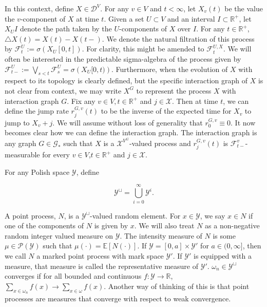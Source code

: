 \documentclass[12pt]{article}
\newcommand{\mb}{\mathbb}
\newcommand{\mc}{\mathcal}
\newcommand{\ra}{\rightarrow}
\newcommand{\ind}{\hspace{24pt}}
\newcommand{\ex}[1]{\mb{E}\left[#1\right]}			%
\newcommand{\defeq}{:=}								%
\newcommand{\pmsr}{\mc{P}}							%
\newcommand{\cad}{\mc{D}}							%
\newcommand{\sta}{\mc{X}}							%
\newcommand{\Xf}{X}									%
\newcommand{\poiss}{N}								%
\newcommand{\rate}{r}								%
\newcommand{\F}{\mc{F}}								%
\newcommand{\delt}{\triangle}						%
\newcommand{\vind}[1]{_{#1}}						%
\newcommand{\tme}[1]{(#1)}							%
\newcommand{\tmi}[1]{#1}							%
\newcommand{\gind}[1]{^{#1}}						%
\newcommand{\vpara}[1]{^{#1}}						%
\newcommand{\stpara}[1]{_{#1}}						%
\newcommand{\tpara}[1]{_{#1}}						%
\newcommand{\gvpara}[2]{^{#1,#2}}					%
\newcommand{\vpropara}[2]{^{#1,#2}}					%
\newcommand{\Gs}{\mc{G}_\ast}						%
\newcommand{\spce}{\mc{Y}}							%
\renewcommand{\it}[1]{_{#1}}						%
\begin{document}
\ind In this context, define \(\Xf \in \cad\vpara{V}\). For any \(v \in V\) and \(t < \infty\), let \(\Xf\vind{v}\tme{t}\) be the value the \(v\)-component of \(\Xf\) at time \(t\). Given a set \(U\subset V\) and an interval \(I \subset \mb{R}^+\), let \(\Xf\vind{U}\tmi{I}\) denote the path taken by the \(U\)-components of \(\Xf\) over \(\tmi{I}\). For any \(t\in\mb{R}^+\), \(\delt \Xf\tme{t} = \Xf\tme{t} - \Xf\tme{t-}\). We denote the natural filtration of this process by \(\F\vpara{U}\tpara{t} \defeq \sigma \left(\Xf\vind{U}\tmi{[0,t]}\right)\). For clarity, this might be amended to \(\F\vpropara{U}{\Xf}\tpara{t}\). We will often be interested in the predictable sigma-algebra of the process given by \(\F\vpara{U}\tpara{t-} \defeq \bigvee_{s < t} \F\vpara{U}\tpara{s} = \sigma\left(\Xf\vind{U}\tmi{[0,t)}\right)\). Furthermore, when the evolution of \(\Xf\) with respect to its topology is clearly defined, but the specific interaction graph of \(\Xf\) is not clear from context, we may write \(\Xf\gind{G}\) to represent the process \(\Xf\) with interaction graph \(G\). Fix any \(v \in V,t \in \mb{R}^+\) and \(j \in \sta\). Then at time \(t\), we can define the jump rate \(\rate\gvpara{G}{v}\stpara{j}(t)\) to be the inverse of the expected time for \(\Xf\vind{v}\) to jump to \(\Xf\vind{v} + j\). We will assume without loss of generality that \(\rate\gvpara{G}{v}\stpara{0}\equiv 0\). It now becomes clear how we can define the interaction graph. The interaction graph is any graph \(G\in \Gs\) such that \(\Xf\) is a \(\sta^{V\gind{G}}\)-valued process and \(\rate\gvpara{G}{v}\stpara{j}(t)\) is \(\F\vpara{v}\tpara{t-}\)-measurable for every \(v \in V\),\(t\in \mb{R}^+\) and \(j \in \sta\). 

\ind For any Polish space \(\spce\), define

\[\spce^\sqcup = \bigcup_{i=0}^\infty \spce^i.\]

A point process, \(\poiss\), is a \(\spce^\sqcup\)-valued random element. For \(x \in \spce\), we say \(x \in \poiss\) if one of the components of \(\poiss\) is given by \(x\). We will also treat \(\poiss\) as a non-negative random integer valued measure on \(\spce\). The intensity measure of \(\poiss\) is some \(\mu\in \pmsr(\spce)\) such that \(\mu(\cdot) = \ex{\poiss(\cdot)}\). If \(\spce = [0,a]\times \spce'\) for \(a \in (0,\infty]\), then we call \(\poiss\) a marked point process with mark space \(\spce'\). If \(\spce'\) is equipped with a measure, that measure is called the representative measure of \(\spce'\). \(\omega\it{n} \in \spce^\sqcup\) converges if for all bounded and continuous \(f: \spce \ra \mb{R}\), \(\sum_{x \in \omega\it{n}} f(x) \ra \sum_{x \in \omega} f(x)\). Another way of thinking of this is that point processes are measures that converge with respect to weak convergence.
\end{document}
